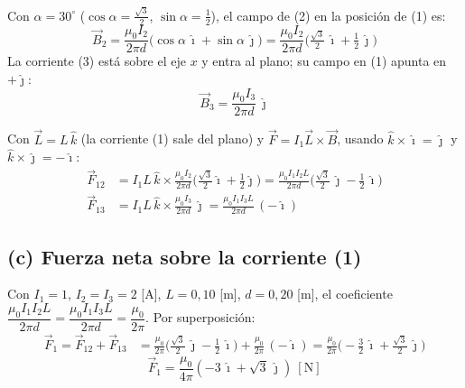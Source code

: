 \documentclass[12pt,letterpaper]{article}
\begin{document}
\hfill
\begin{minipage}[t]{0.55\textwidth}
\vspace{0pt}
Con $\alpha=30^\circ$ ($\cos\alpha=\tfrac{\sqrt3}{2}$, $\sin\alpha=\tfrac12$), el campo de (2) en la
posici\'on de (1) es:
\[
    \vec{B}_2 = \frac{\mu_0 I_2}{2\pi d}\big(\cos\alpha\,\hat{\imath}+\sin\alpha\,\hat{\jmath}\big)
              = \frac{\mu_0 I_2}{2\pi d}\Big(\tfrac{\sqrt{3}}{2}\,\hat{\imath}+\tfrac{1}{2}\,\hat{\jmath}\Big)
\]
La corriente (3) est\'a sobre el eje $x$ y entra al plano; su campo en (1) apunta en $+\hat{\jmath}$:
\[
    \vec{B}_3 = \frac{\mu_0 I_3}{2\pi d}\,\hat{\jmath}
\]
\end{minipage}

\medskip

\noindent Con $\vec{L}=L\,\hat{k}$ (la corriente (1) sale del plano) y $\vec{F}=I_1\vec{L}\times\vec{B}$,
usando $\hat{k}\times\hat{\imath}=\hat{\jmath}$ y $\hat{k}\times\hat{\jmath}=-\hat{\imath}$:
\begin{align*}
    \vec{F}_{12} &= I_1 L\,\hat{k}\times\frac{\mu_0 I_2}{2\pi d}
        \Big(\tfrac{\sqrt{3}}{2}\hat{\imath}+\tfrac12\hat{\jmath}\Big)
        = \frac{\mu_0 I_1 I_2 L}{2\pi d}\Big(\tfrac{\sqrt{3}}{2}\,\hat{\jmath}-\tfrac12\,\hat{\imath}\Big)\\
    \vec{F}_{13} &= I_1 L\,\hat{k}\times\frac{\mu_0 I_3}{2\pi d}\,\hat{\jmath}
        = \frac{\mu_0 I_1 I_3 L}{2\pi d}\,(-\hat{\imath})
\end{align*}

\subsection*{(c) Fuerza neta sobre la corriente (1)}

Con $I_1=1$, $I_2=I_3=2$ [A], $L=0{,}10$ [m], $d=0{,}20$ [m], el coeficiente
$\dfrac{\mu_0 I_1 I_2 L}{2\pi d}=\dfrac{\mu_0 I_1 I_3 L}{2\pi d}=\dfrac{\mu_0}{2\pi}$. Por
superposici\'on:
\begin{align*}
    \vec{F}_1 = \vec{F}_{12}+\vec{F}_{13}
      &= \frac{\mu_0}{2\pi}\Big(\tfrac{\sqrt{3}}{2}\,\hat{\jmath}-\tfrac12\,\hat{\imath}\Big)
         + \frac{\mu_0}{2\pi}\,(-\hat{\imath})
       = \frac{\mu_0}{2\pi}\Big(-\tfrac{3}{2}\,\hat{\imath}+\tfrac{\sqrt{3}}{2}\,\hat{\jmath}\Big)
\end{align*}
\[
    \boxed{\vec{F}_1 = \frac{\mu_0}{4\pi}\left(-3\,\hat{\imath}+\sqrt{3}\,\hat{\jmath}\right)\ [\text{N}]}
\]
\end{document}

